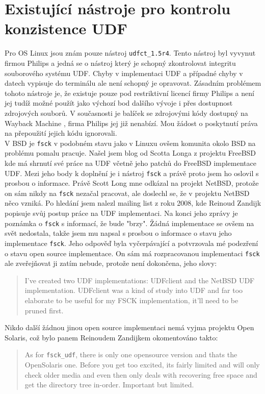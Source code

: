 \section{Existující nástroje pro kontrolu konzistence UDF}
Pro OS Linux jsou znám pouze nástroj \texttt{udfct\_1.5r4}. Tento nástroj byl vyvynut firmou Philips a jedná se o nástroj který je schopný zkontrolovat integritu souborového systému UDF. Chyby v implementaci UDF a případné chyby v datech vypisuje do terminálu ale není schopný je opravovat. Zásadním problémem tohoto nástroje je, že existuje pouze pod restriktivní licencí firmy Philips a není jej tudíž možné použít jako výchozí bod dalšího vývoje i přes dostupnost zdrojových souborů. V současnosti je balíček se zdrojovými kódy dostupný na Wayback Machine \cite{wayback}, firma Philips jej již nenabízí. Mou žádost o poskytnutí práva na přepoužití jejich kódu ignorovali.\\
V BSD je \texttt{fsck} v podobném stavu jako v Linuxu ovšem komunita okolo BSD na problému pomalu pracuje. Našel jsem blog \cite{scottuvblog} od Scotta Longa z projektu FreeBSD kde má shrnutí své práce na UDF včetně jeho patchů do FreeBSD implementace UDF. Mezi jeho body k doplnění je i nástroj \texttt{fsck} a právě proto jsem ho oslovil s prosbou o informace. Právě Scott Long mne odkázal na projekt NetBSD, protože on sám nikdy na \texttt{fsck} nezačal pracovat, ale doslechl se, že v projektu NetBSD něco vzniká. Po hledání jsem nalezl mailing list z roku 2008, kde Reinoud Zandijk popisuje svůj postup práce na UDF implementaci. Na konci jeho zprávy je poznámka o \texttt{fsck} s informací, že bude "brzy". Žádná implementace se ovšem na svět nedostala, takže jsem mu napsal s prosbou o informace o  stavu jeho implementace \texttt{fsck}. Jeho odpověď byla vyčerpávající a potvrzovala mé podezření o stavu open source implementace. On sám má rozpracovanou implementaci \texttt{fsck} ale zveřejňovat ji zatím nebude, protože není dokončena, jeho slovy: 
\begin{quote} 
I've created two UDF implementations: UDFclient \cite{13monkey} and the NetBSD UDF implementation. UDFclient was a kind of study into UDF and far too elaborate to be useful for my FSCK implementation, it'll need to be pruned first.
\end{quote} 
Nikdo další žádnou jinou open source implementaci nemá vyjma projektu Open Solaris, což bylo panem Reinoudem Zandijkem okomentováno takto:
\begin{quote}
As for \texttt{fsck\_udf}, there is only one opensource version and thats the OpenSolaris one. Before you get too excited, its fairly limited and will only check older media and even then only deals with recovering free space and get the directory tree in-order. Important but limited.
\end{quote}
